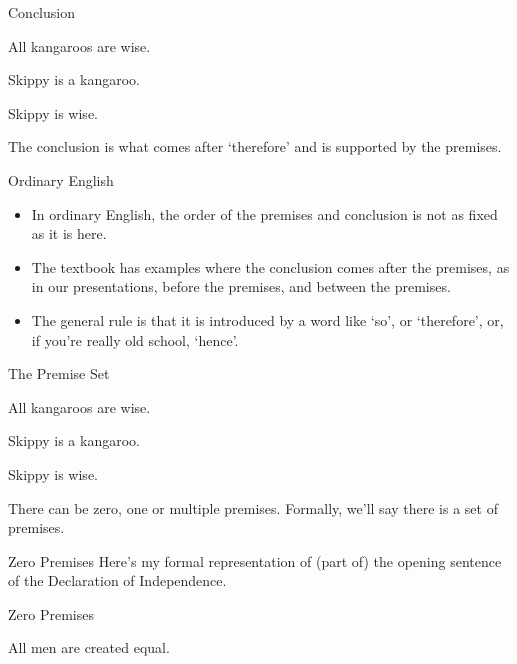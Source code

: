 \documentclass[
  ignorenonframetext,
]{beamer}
\providecommand{\tightlist}{%
  \setlength{\itemsep}{0pt}\setlength{\parskip}{0pt}}
\renewcommand{\,}{\text{, }}
\begin{document}
\begin{frame}{Conclusion}
\protect\hypertarget{conclusion}{}
\begin{description}
\tightlist
\item[~]
All kangaroos are wise.
\item[~]
Skippy is a kangaroo.
\item[\(\therefore\)]
Skippy is wise.
\end{description}

The conclusion is what comes after `therefore' and is supported by the
premises.
\end{frame}

\begin{frame}{Ordinary English}
\protect\hypertarget{ordinary-english}{}
\begin{itemize}
\tightlist
\item
  In ordinary English, the order of the premises and conclusion is not
  as fixed as it is here.
\item
  The textbook has examples where the conclusion comes after the
  premises, as in our presentations, before the premises, and between
  the premises.
\item
  The general rule is that it is introduced by a word like `so', or
  `therefore', or, if you're really old school, `hence'.
\end{itemize}
\end{frame}

\begin{frame}{The Premise Set}
\protect\hypertarget{the-premise-set}{}
\begin{description}
\tightlist
\item[~]
All kangaroos are wise.
\item[~]
Skippy is a kangaroo.
\item[\(\therefore\)]
Skippy is wise.
\end{description}

There can be zero, one or multiple premises. Formally, we'll say there
is a set of premises.
\end{frame}

\begin{frame}{Zero Premises}
\protect\hypertarget{zero-premises}{}
Here's my formal representation of (part of) the opening sentence of the
Declaration of Independence.
\end{frame}

\begin{frame}{Zero Premises}
\protect\hypertarget{zero-premises-1}{}
\begin{description}
\tightlist
\item[\(\therefore\)]
All men are created equal.
\end{description}
\end{frame}
\end{document}
